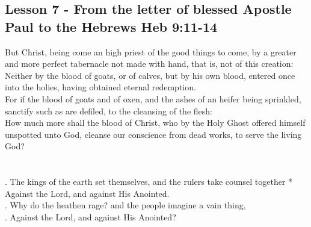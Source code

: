 \subsection{Lesson 7 - From the letter of blessed Apostle Paul to the Hebrews
Heb 9:11-14}
\begin{Parallel}[v]{\colw}{\colx}
{}
{\vern
{\noindent
But Christ, being come an high priest of the good things to come, by a greater and more perfect tabernacle not made with hand, that is, not of this creation:\\
Neither by the blood of goats, or of calves, but by his own blood, entered once into the holies, having obtained eternal redemption.\\
For if the blood of goats and of oxen, and the ashes of an heifer being sprinkled, sanctify such as are defiled, to the cleansing of the flesh:\\
How much more shall the blood of Christ, who by the Holy Ghost offered himself unspotted unto God, cleanse our conscience from dead works, to serve the living God?
\\ \\ \\
\Rbar. The kings of the earth set themselves, and the rulers take counsel together
* Against the Lord, and against His Anointed.\\
\Vbar. Why do the heathen rage? and the people imagine a vain thing,\\
\Rbar. Against the Lord, and against His Anointed?}}

\end{Parallel}